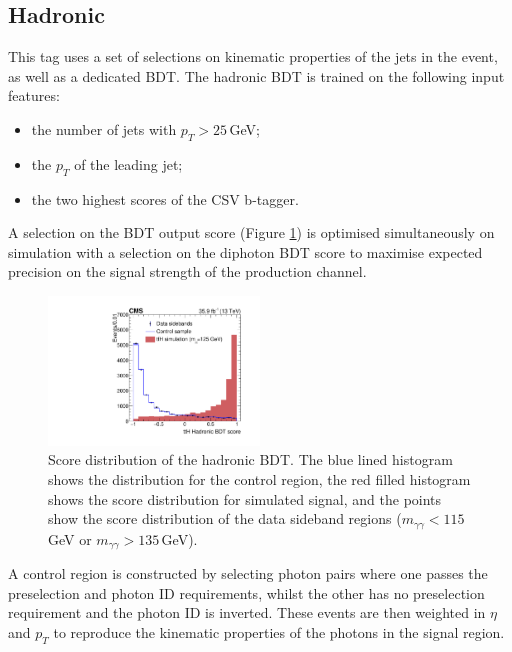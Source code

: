 \subsection{\ttH Hadronic}
This tag uses a set of selections on kinematic properties of the jets in the event, as well as a dedicated BDT. The \ttH hadronic BDT is trained on the following input features:
\begin{itemize}[noitemsep]
    \item the number of jets with $p_{T} > 25$\,GeV;
    \item the $p_{T}$ of the leading jet;
    \item the two highest scores of the CSV b-tagger.
\end{itemize}
A selection on the BDT output score (Figure \ref{fig:event_categorisaton:tth_hadronic_bdt}) is optimised simultaneously on simulation with a selection on the diphoton BDT score to maximise expected precision on the signal strength of the \ttH production channel. 
\begin{figure}[h!]
    \centering
    \includegraphics[width=0.5\textwidth]{figures/event_selection/CMS-HIG-16-040_Figure_006.pdf}
    \caption{Score distribution of the hadronic \ttH BDT. The blue lined histogram shows the distribution for the control region, the red filled histogram shows the score distribution for simulated signal, and the points show the score distribution of the data sideband regions ($m_{\gamma\gamma} < 115$\,GeV or $m_{\gamma\gamma} > 135$\,GeV).}
        \label{fig:event_categorisaton:tth_hadronic_bdt}
\end{figure}

A control region is constructed by selecting photon pairs where one passes the preselection and photon ID requirements, whilst the other has no preselection requirement and the photon ID is inverted.
These events are then weighted in $\eta$ and $p_T$ to reproduce the kinematic properties of the photons in the signal region.

